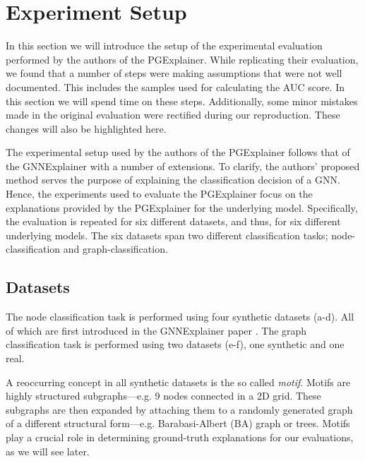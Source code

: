 \section{Experiment Setup}\label{sec:replication} 
In this section we will introduce the setup of the experimental evaluation performed by the authors of the PGExplainer. While replicating their evaluation, we found that a number of steps were making assumptions that were not well documented. This includes the samples used for calculating the AUC score. In this section we will spend time on these steps. Additionally, some minor mistakes made in the original evaluation were rectified during our reproduction. These changes will also be highlighted here.

The experimental setup used by the authors of the PGExplainer follows that of the GNNExplainer \cite{ying2019gnnexplainer} with a number of extensions. To clarify, the authors' proposed method serves the purpose of explaining the classification decision of a GNN. Hence, the experiments used to evaluate the PGExplainer focus on the explanations provided by the PGExplainer for the underlying model. Specifically, the evaluation is repeated for six different datasets, and thus, for six different underlying models. The six datasets span two different classification tasks; node-classification and graph-classification. 

\subsection{Datasets}\label{sec:datasets}
The node classification task is performed using four synthetic datasets (a-d). All of which are first introduced in the GNNExplainer paper \cite{ying2019gnnexplainer}. The graph classification task is performed using two datasets (e-f), one synthetic and one real.

A reoccurring concept in all synthetic datasets is the so called \textit{motif}. Motifs are highly structured subgraphs---e.g. 9 nodes connected in a 2D grid. These subgraphs are then expanded by attaching them to a randomly generated graph of a different structural form---e.g. Barabasi-Albert (BA) graph \cite{Barabasi99emergenceScaling} or trees. Motifs play a crucial role in determining ground-truth explanations for our evaluations, as we will see later.

